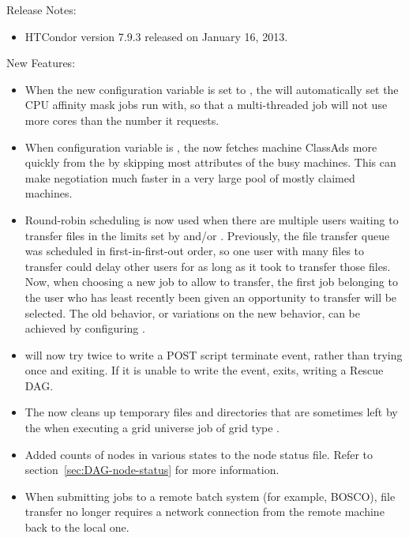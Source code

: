 \noindent Release Notes:

\begin{itemize}

\item HTCondor version 7.9.3 released on January 16, 2013.

\end{itemize}


\noindent New Features:

\begin{itemize}

\item When the new configuration variable 
is set to , 
the  will automatically set the CPU affinity
mask jobs run with, so that a multi-threaded job will not use
more cores than the number it requests.

\item When configuration variable 
is , the 
now fetches machine ClassAds more quickly from the 
 by skipping most attributes of the busy machines.  
This can make negotiation much faster in
a very large pool of mostly claimed machines.

\item Round-robin scheduling is now used when there are multiple users
waiting to transfer files in the limits set by
 and/or
.  Previously, the file transfer
queue was scheduled in first-in-first-out order, so one user with
many files to transfer could delay other users for as long as it took
to transfer those files.  Now, when choosing a new job to allow to
transfer, the first job belonging to the user who has least
recently been given an opportunity to transfer will be selected.
The old behavior, or variations on the new behavior, can be achieved
by configuring .

\item {} will now try twice to write a POST script terminate
event, rather than trying once and exiting. 
If it is unable to write the event,  exits, 
writing a Rescue DAG. 

\item The  now cleans up temporary files and directories
that are sometimes left by the  when executing a grid
universe job of grid type .

\item Added counts of nodes in various states to the 
node status file.  Refer to section~\ref{sec:DAG-node-status} for
more information.

\item When submitting jobs to a remote batch system (for example, BOSCO),
file transfer no longer requires a network connection from the remote machine
back to the local one.

\end{itemize}

